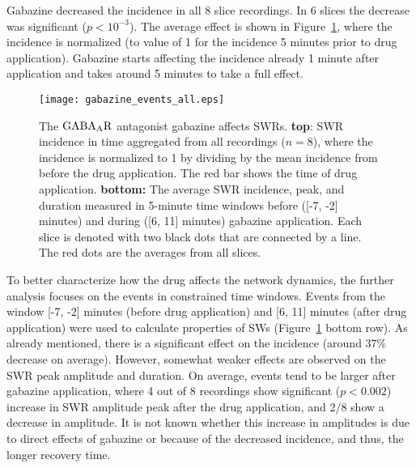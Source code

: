    Gabazine decreased the incidence in all 8 slice recordings. In 6 slices the
    decrease was significant ($p<10^{-3}$). The average effect is shown in
    Figure~\ref{fig:gabazine_sum}, where the incidence is normalized (to value
    of 1 for the incidence 5 minutes prior to drug application). Gabazine
    starts affecting the incidence already 1 minute after application and takes
    around 5 minutes to take a full effect. 
    
    \begin{figure}
      \center
      \texttt{[image: gabazine\_events\_all.eps]}
      \caption{
        The $\rm GABA_AR$ antagonist gabazine affects SWRs. {\bf top}: SWR
        incidence in time aggregated from all recordings ($n=8$), where the
        incidence is normalized to 1 by dividing by the mean incidence from
        before the drug application. The red bar shows the time of drug
        application.  {\bf bottom:} The average SWR incidence, peak, and
        duration measured in 5-minute time windows before ([-7, -2] minutes)
        and during ([6, 11] minutes) gabazine application. Each slice is
        denoted with two black dots that are connected by a line. The red dots
        are the averages from all slices.
      }
      \label{fig:gabazine_sum}
    \end{figure}

    To better characterize how the drug affects the network dynamics, the
    further analysis focuses on the events in constrained time windows. Events
    from the window [-7, -2] minutes (before drug application) and [6, 11]
    minutes (after drug application) were used to calculate properties of SWs
    (Figure~\ref{fig:gabazine_sum} bottom row). As already mentioned, there is
    a significant effect on the incidence (around 37\% decrease on average).
    However, somewhat weaker effects are observed on the SWR peak amplitude and
    duration. On average, events tend to be larger after gabazine application,
    where 4 out of 8 recordings show significant ($p<0.002$) increase in SWR
    amplitude peak after the drug application, and 2/8 show a decrease in
    amplitude. It is not known whether this increase in amplitudes is due to
    direct effects of gabazine or because of the decreased incidence, and thus,
    the longer recovery time. 

